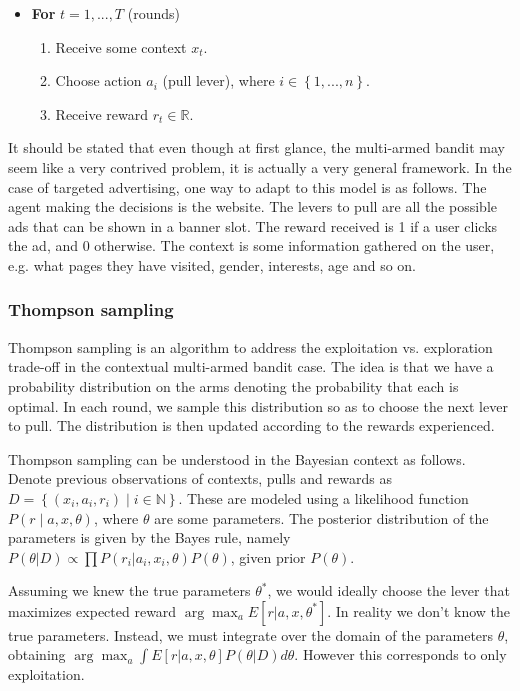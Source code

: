 \documentclass{article} %
\newcommand{\setof}[1]{\ensuremath{\left \{ #1 \right \}}}
\begin{document}
\begin{itemize}
  \item[]
    \textbf{For} $t = 1, ..., T$ (rounds)
    \begin{enumerate}
      \item{Receive some context $x_t$.}
      \item{Choose action  $a_i$ (pull lever), where $i \in \setof{1,...,n}$.}
      \item{Receive reward $r_t \in \mathbb{R}$.}
    \end{enumerate}
\end{itemize}

It should be stated that even though at first glance, the multi-armed bandit
may seem like a very contrived problem, it is actually a very general
framework. In the case of targeted advertising, one way to adapt to this model
is as follows.  The agent making the decisions is the website. The levers to
pull are all the possible ads that can be shown in a banner slot. The reward
received is 1 if a user clicks the ad, and 0 otherwise. The context is some
information gathered on the user, e.g. what pages they have visited, gender,
interests, age and so on.

\subsubsection{Thompson sampling}
Thompson sampling \cite{chapelle2011empirical} is an algorithm to address the
exploitation vs. exploration trade-off in the contextual multi-armed bandit
case. The idea is that we have a probability distribution on the arms denoting
the probability that each is optimal. In each round, we sample this
distribution so as to choose the next lever to pull. The distribution is then
updated according to the rewards experienced.

Thompson sampling can be understood in the Bayesian context as follows. Denote
previous observations of contexts, pulls and rewards as $D = \setof{(x_i, a_i,
r_i) \;|\; i \in \mathbb{N}}$. These are modeled using a likelihood function
$P(r \;|\; a,x,\theta)$, where $\theta$ are some parameters. The posterior
distribution of the parameters is given by the Bayes rule, namely $P(\theta |
D) \propto \prod P(r_i | a_i, x_i, \theta) P(\theta)$, given prior $P(\theta)$.

Assuming we knew the true parameters $\theta^*$, we would ideally choose the
lever that maximizes expected reward $\arg\max_a E[r | a, x, \theta^*]$. In
reality we don't know the true parameters. Instead, we must integrate over the
domain of the parameters $\theta$, obtaining $\arg\max_a \int E[r | a, x,
\theta] P(\theta|D) d\theta$. However this corresponds to only exploitation.
\end{document}

